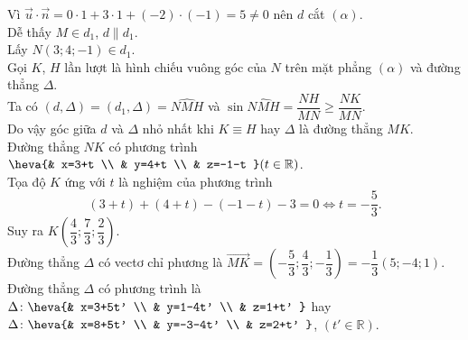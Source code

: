 \begin{ex}
{		Vì $\overrightarrow{u}\cdot \overrightarrow{n}=0\cdot 1+3\cdot 1+( -2)\cdot ( -1)=5\ne 0$ nên $ d$ cắt $( \alpha)$.\\ 
		 Dễ thấy $M\in {d_1}$, $d\parallel{d_1}$.\\
		 Lấy $N( 3;4;-1)\in {d_1}$.\\
		Gọi $K$, $H$ lần lượt là hình chiếu vuông góc  của $N$ trên mặt phẳng $( \alpha)$ và đường thẳng $\Delta $.\\
		Ta  có $( d,\Delta)=( {d_1},\Delta)=\widehat{NMH}$ và $\sin \widehat{NMH}=\dfrac{NH}{MN}\ge \dfrac{NK}{MN} $.\\
		Do vậy góc giữa $d$  và $\Delta$ nhỏ nhất khi $K\equiv H$ hay $\Delta $ là đường thẳng $MK$.\\
		Đường thẳng $NK$ có phương trình $\heva{& x=3+t \\ & y=4+t \\ & z=-1-t  }(t\in\mathbb{R})$.\\
		Tọa độ $K$ ứng với $ t$  là nghiệm của phương trình
		\[( 3+t)+( 4+t)-(  -1-t)-3=0\Leftrightarrow t=-\dfrac{5}{3}.\]
		 Suy ra $K\left(\dfrac{4}{3};\dfrac{7}{3};\dfrac{2}{3}\right)$.\\
		Đường thẳng $\Delta$ có  vectơ chỉ phương là $\overrightarrow{MK}=\left(-\dfrac{5}{3};\dfrac{4}{3};-\dfrac{1}{3}\right)=-\dfrac{1}{3}( 5;-4;1)$.\\
		Đường thẳng $\Delta$ có phương trình là $\Delta\colon\heva{& x=3+5t' \\ & y=1-4t' \\ & z=1+t' }$ hay  $\Delta\colon \heva{& x=8+5t' \\ & y=-3-4t' \\ & z=2+t' }$, $(t'\in\mathbb{R})$.
	} 
\end{ex}

